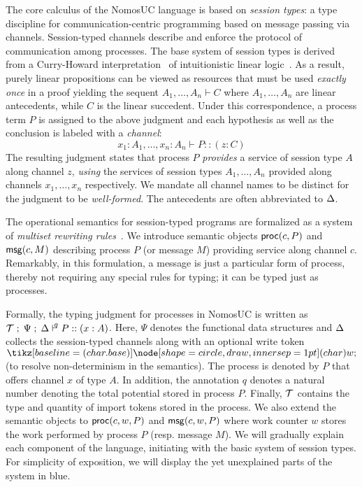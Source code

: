 The core calculus of the NomosUC language is based on
\emph{session types}: a type discipline for communication-centric programming
based on message passing via channels. Session-typed channels describe and
enforce the protocol of communication among processes. The base system of
session types is derived from a Curry-Howard interpretation~\cite{CairesCONCUR2010}
of intuitionistic linear logic~\cite{GirardTCS1987}.
As a result, purely linear
propositions can be viewed as resources that must be used \emph{exactly
once} in a proof yielding the sequent $A_1, \ldots, A_n \vdash C$
where $A_1, \ldots, A_n$ are linear antecedents, while $C$ is the linear
succedent. Under this correspondence, a process term $P$ is assigned to
the above judgment and each hypothesis as well as the conclusion is
labeled with a \emph{channel}:
\[
x_1 : A_1, \ldots, x_n : A_n \vdash P :: (z : C)
\]
The resulting judgment states that process $P$ \emph{provides} a service
of session type $A$ along channel $z$, \emph{using} the services of session
types $A_1, \ldots, A_n$ provided along channels $x_1, \ldots, x_n$
respectively. We mandate all channel names to be distinct for the judgment
to be \emph{well-formed}. The antecedents are often abbreviated to $\Delta$.

The operational semantics for session-typed programs are formalized as a
system of \emph{multiset rewriting rules}~\cite{Cervesato2009SSOS}.
We introduce semantic objects $\mathsf{proc}(c, P)$ and $\mathsf{msg}(c, M)$ describing
process $P$ (or message $M$) providing service along channel $c$.
Remarkably, in this formulation, a message is just a particular form of process,
thereby not requiring any special rules for typing; it can be typed just as processes.

Formally, the typing judgment for processes in NomosUC is written as
$\Tokens \semi \Psi \semi \D \entailpot{q} P :: (x : A)$.
Here, $\Psi$ denotes the functional data structures and $\Delta$ collects the
session-typed channels along with an optional write token $\wt$
(to resolve non-determinism in the semantics).
The process is denoted by $P$ that offers channel $x$ of type $A$.
In addition, the annotation $q$ denotes a natural number denoting the
total potential stored in process $P$.
Finally, $\mathcal{T}$ contains the type and quantity of import tokens
stored in the process.
We also extend the semantic objects to $\mathsf{proc}(c, w, P)$ and $\mathsf{msg}(c, w, P)$
where work counter $w$ stores the work performed by process $P$ (resp.
message $M$).
We will gradually explain each component of the language, initiating
with the basic system of session types.
For simplicity of exposition, we will display the yet unexplained
parts of the system in blue.

